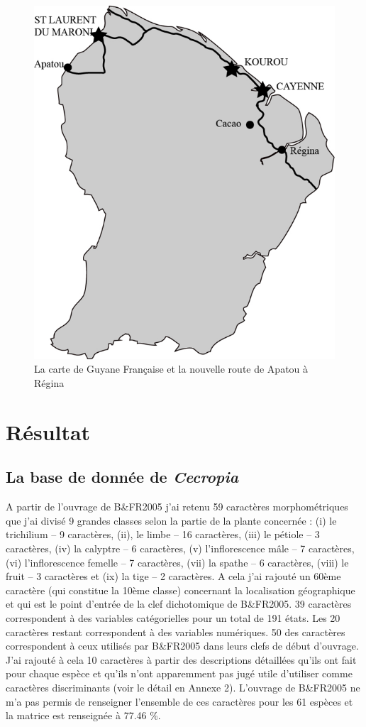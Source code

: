 \documentclass[a4paper]{article}
\theoremstyle{definition}
\theoremstyle{definition}
\theoremstyle{definition}
\theoremstyle{remark}
\begin{document}
\begin{figure}[H]

{\centering \includegraphics[width=0.7\linewidth]{figure/fig4} 

}

\caption{La carte de Guyane Française et la nouvelle route de Apatou à
Régina}\label{fig:fig4}
\end{figure}

\pagebreak

\section{Résultat}\label{resultat}

\subsection{\texorpdfstring{La base de donnée de
\emph{Cecropia}}{La base de donnée de Cecropia}}\label{la-base-de-donnee-de-cecropia}

A partir de l'ouvrage de B\&FR2005 j'ai retenu 59 caractères
morphométriques que j'ai divisé 9 grandes classes selon la partie de la
plante concernée : (i) le trichilium -- 9 caractères, (ii), le limbe --
16 caractères, (iii) le pétiole -- 3 caractères, (iv) la calyptre -- 6
caractères, (v) l'inflorescence mâle -- 7 caractères, (vi)
l'inflorescence femelle -- 7 caractères, (vii) la spathe -- 6
caractères, (viii) le fruit -- 3 caractères et (ix) la tige -- 2
caractères. A cela j'ai rajouté un 60ème caractère (qui constitue la
10ème classe) concernant la localisation géographique et qui est le
point d'entrée de la clef dichotomique de B\&FR2005. 39 caractères
correspondent à des variables catégorielles pour un total de 191 états.
Les 20 caractères restant correspondent à des variables numériques. 50
des caractères correspondent à ceux utilisés par B\&FR2005 dans leurs
clefs de début d'ouvrage. J'ai rajouté à cela 10 caractères à partir des
descriptions détaillées qu'ils ont fait pour chaque espèce et qu'ils
n'ont apparemment pas jugé utile d'utiliser comme caractères
discriminants (voir le détail en Annexe 2). L'ouvrage de B\&FR2005 ne
m'a pas permis de renseigner l'ensemble de ces caractères pour les 61
espèces et la matrice est renseignée à 77.46 \%.
\end{document}
